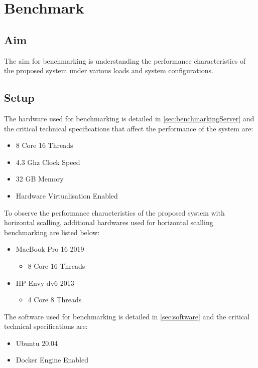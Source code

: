 \documentclass[../thesis.tex]{subfiles}
\begin{document}
\chapter{Benchmark}
\label{chap:bm}

\section{Aim}
The aim for benchmarking is understanding the performance characteristics of the proposed system under various loads and system configurations.

\section{Setup}

The hardware used for benchmarking is detailed in \autoref{sec:benchmarkingServer} and the critical technical specifications that affect the performance of the system are:
\begin{itemize}
	\item 8 Core 16 Threads
	\item 4.3 Ghz Clock Speed
	\item 32 GB Memory
	\item Hardware Virtualisation Enabled
\end{itemize}

To observe the performance characteristics of the proposed system with horizontal scalling, additional hardwares used for horizontal scalling benchmarking are listed below:
\begin{itemize}
	\item MacBook Pro 16 2019
		\begin{itemize}
			\item 8 Core 16 Threads
		\end{itemize}
	\item HP Envy dv6 2013
		\begin{itemize}
			\item 4 Core 8 Threads
		\end{itemize}
\end{itemize}


The software used for benchmarking is detailed in \autoref{sec:software} and the critical technical specifications are:
\begin{itemize}
	\item Ubuntu 20.04
	\item Docker Engine Enabled
\end{itemize}
\end{document}

